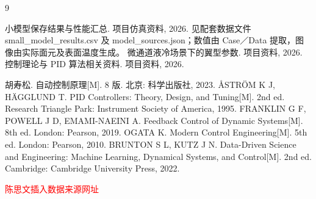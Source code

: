 \documentclass[stage2,fontset=fandol]{ydzjreport}
\begin{document}
\begin{thebibliography}{9}

 小模型保存结果与性能汇总. 项目仿真资料, 2026. 见配套数据文件 small\_model\_results.csv 及 model\_sources.json；数值由 Case／Data 提取，图像由实际面元及表面温度生成。
 微通道液冷场景下的翼型参数. 项目资料, 2026.
 控制理论与 PID 算法相关资料. 项目资料, 2026.

 胡寿松. 自动控制原理[M]. 8 版. 北京: 科学出版社, 2023.
 {\AA}STR{\"O}M K J, H{\"A}GGLUND T. PID Controllers: Theory, Design, and Tuning[M]. 2nd ed. Research Triangle Park: Instrument Society of America, 1995.
 FRANKLIN G F, POWELL J D, EMAMI-NAEINI A. Feedback Control of Dynamic Systems[M]. 8th ed. London: Pearson, 2019.
 OGATA K. Modern Control Engineering[M]. 5th ed. London: Pearson, 2010.
 BRUNTON S L, KUTZ J N. Data-Driven Science and Engineering: Machine Learning, Dynamical Systems, and Control[M]. 2nd ed. Cambridge: Cambridge University Press, 2022.
\end{thebibliography}
\textcolor{red}{陈思文插入数据来源网址}
\end{document}
